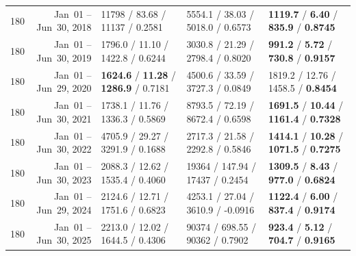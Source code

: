 \begin{longtable}{r r l l l}
180 & Jan~01 -- Jun~30, 2018 & 11798 / 83.68 / 11137 / 0.2581 & 5554.1 / 38.03 / 5018.0 / 0.6573 & \textbf{1119.7} / \textbf{6.40} / \textbf{835.9} / \textbf{0.8745} \\
180 & Jan~01 -- Jun~30, 2019 & 1796.0 / 11.10 / 1422.8 / 0.6244 & 3030.8 / 21.29 / 2798.4 / 0.8020 & \textbf{991.2} / \textbf{5.72} / \textbf{730.8} / \textbf{0.9157} \\
180 & Jan~01 -- Jun~29, 2020 & \textbf{1624.6} / \textbf{11.28} / \textbf{1286.9} / 0.7181 & 4500.6 / 33.59 / 3727.3 / 0.0849 & 1819.2 / 12.76 / 1458.5 / \textbf{0.8454} \\
180 & Jan~01 -- Jun~30, 2021 & 1738.1 / 11.76 / 1336.3 / 0.5869 & 8793.5 / 72.19 / 8672.4 / 0.6598 & \textbf{1691.5} / \textbf{10.44} / \textbf{1161.4} / \textbf{0.7328} \\
180 & Jan~01 -- Jun~30, 2022 & 4705.9 / 29.27 / 3291.9 / 0.1688 & 2717.3 / 21.58 / 2292.8 / 0.5846 & \textbf{1414.1} / \textbf{10.28} / \textbf{1071.5} / \textbf{0.7275} \\
180 & Jan~01 -- Jun~30, 2023 & 2088.3 / 12.62 / 1535.4 / 0.4060 & 19364 / 147.94 / 17437 / 0.2454 & \textbf{1309.5} / \textbf{8.43} / \textbf{977.0} / \textbf{0.6824} \\
180 & Jan~01 -- Jun~29, 2024 & 2124.6 / 12.71 / 1751.6 / 0.6823 & 4253.1 / 27.04 / 3610.9 / -0.0916 & \textbf{1122.4} / \textbf{6.00} / \textbf{837.4} / \textbf{0.9174} \\
180 & Jan~01 -- Jun~30, 2025 & 2213.0 / 12.02 / 1644.5 / 0.4306 & 90374 / 698.55 / 90362 / 0.7902 & \textbf{923.4} / \textbf{5.12} / \textbf{704.7} / \textbf{0.9165} \\
\end{longtable}